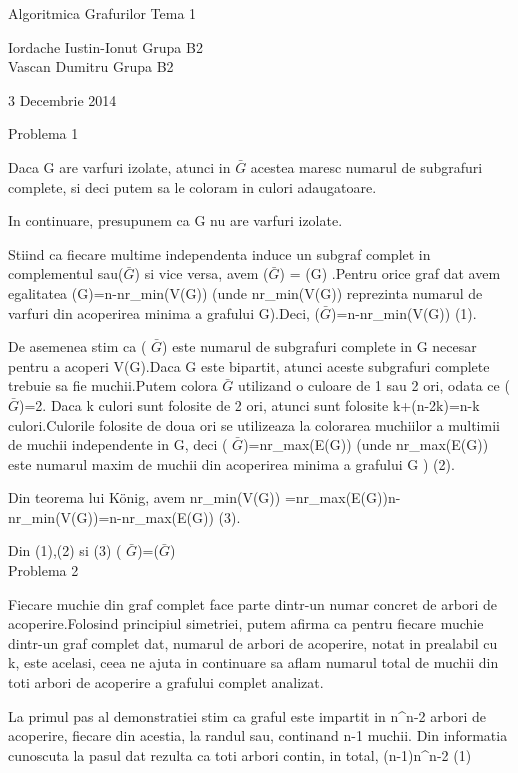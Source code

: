 Algoritmica Grafurilor Tema 1 

Iordache Iustin-Ionut Grupa B2\\Vascan Dumitru Grupa B2 

3 Decembrie 2014

Problema 1

Daca G are varfuri izolate, atunci in $\bar{G}$ acestea maresc numarul de subgrafuri complete, si deci putem sa le coloram in culori adaugatoare.

In continuare, presupunem ca G nu are varfuri izolate.

Stiind ca fiecare multime independenta induce un subgraf complet in complementul sau($\bar{G}$) si vice versa, avem \omega(\ensuremath{\bar{G}})
 = \alpha(G)
 .Pentru orice graf dat avem egalitatea \alpha(G)=n-nr_{min}(V(G))
 (unde nr_{min}(V(G))
  reprezinta numarul de varfuri din acoperirea minima a grafului G).Deci, \omega(\ensuremath{\bar{G}})=n-nr_{min}(V(G))
  (1). 

De asemenea stim ca \chi(
 $\bar{G}$) este numarul de subgrafuri complete in G necesar pentru a acoperi V(G).Daca G este bipartit, atunci aceste subgrafuri complete trebuie sa fie muchii.Putem colora $\bar{G}$ utilizand o culoare de 1 sau 2 ori, odata ce \alpha
 ($\bar{G}$)=2. Daca k culori sunt folosite de 2 ori, atunci sunt folosite k+(n-2k)=n-k culori.Culorile folosite de doua ori se utilizeaza la colorarea muchiilor a multimii de muchii independente in G, deci \chi(
 $\bar{G}$)=nr_{max}(E(G))
 (unde nr_{max}(E(G))
  este numarul maxim de muchii din acoperirea minima a grafului G ) (2).

Din teorema lui König, avem nr_{min}(V(G))
 =nr_{max}(E(G))\Rightarrow n-nr_{min}(V(G))=n-nr_{max}(E(G))
 (3).

Din (1),(2) si (3) \Rightarrow
 \chi(
 $\bar{G}$)=\omega(\ensuremath{\bar{G}})
 \\

Problema 2

Fiecare muchie din graf complet face parte dintr-un numar concret de arbori de acoperire.Folosind principiul simetriei, putem afirma ca pentru fiecare muchie dintr-un graf complet dat, numarul de arbori de acoperire, notat in prealabil cu k, este acelasi, ceea ne ajuta in continuare sa aflam numarul total de muchii din toti arbori de acoperire a grafului complet analizat.

La primul pas al demonstratiei stim ca graful este impartit in n^{n-2}
  arbori de acoperire, fiecare din acestia, la randul sau, continand n-1 muchii. Din informatia cunoscuta la pasul dat rezulta ca toti arbori contin, in total, (n-1)n^{n-2}
 (1)

